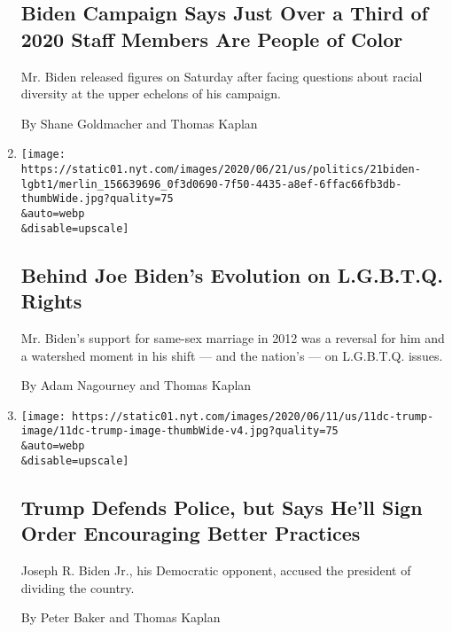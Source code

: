 \begin{enumerate}
  \hypertarget{biden-campaign-says-just-over-a-third-of-2020-staff-members-are-people-of-color}{%
  \subsection{Biden Campaign Says Just Over a Third of 2020 Staff
  Members Are People of
  Color}\label{biden-campaign-says-just-over-a-third-of-2020-staff-members-are-people-of-color}}

  Mr. Biden released figures on Saturday after facing questions about
  racial diversity at the upper echelons of his campaign.

  By Shane Goldmacher and Thomas Kaplan
\item
  \href{/2020/06/21/us/politics/biden-gay-rights-lgbt.html}{}

  \texttt{[image: https://static01.nyt.com/images/2020/06/21/us/politics/21biden-lgbt1/merlin\_156639696\_0f3d0690-7f50-4435-a8ef-6ffac66fb3db-thumbWide.jpg?quality=75\\\&auto=webp\\\&disable=upscale]}

  \hypertarget{behind-joe-bidens-evolution-on-lgbtq-rights}{%
  \subsection{Behind Joe Biden's Evolution on L.G.B.T.Q.
  Rights}\label{behind-joe-bidens-evolution-on-lgbtq-rights}}

  Mr. Biden's support for same-sex marriage in 2012 was a reversal for
  him and a watershed moment in his shift --- and the nation's --- on
  L.G.B.T.Q. issues.

  By Adam Nagourney and Thomas Kaplan
\item
  \href{/2020/06/11/us/politics/trump-biden-police.html}{}

  \texttt{[image: https://static01.nyt.com/images/2020/06/11/us/11dc-trump-image/11dc-trump-image-thumbWide-v4.jpg?quality=75\\\&auto=webp\\\&disable=upscale]}

  \hypertarget{trump-defends-police-but-says-hell-sign-order-encouraging-better-practices}{%
  \subsection{Trump Defends Police, but Says He'll Sign Order
  Encouraging Better
  Practices}\label{trump-defends-police-but-says-hell-sign-order-encouraging-better-practices}}

  Joseph R. Biden Jr., his Democratic opponent, accused the president of
  dividing the country.

  By Peter Baker and Thomas Kaplan
\end{enumerate}


